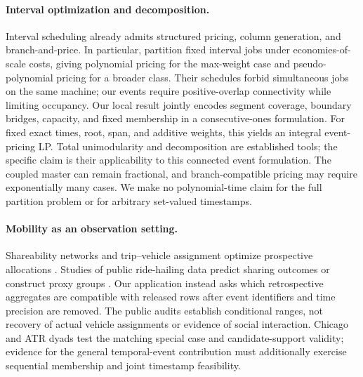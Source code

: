 \paragraph{Interval optimization and decomposition.}
Interval scheduling already admits structured pricing, column generation,
and branch-and-price. In particular, \citet{muir2023interval} partition fixed
interval jobs under economies-of-scale costs, giving polynomial pricing for
the max-weight case and pseudo-polynomial pricing for a broader class.
Their schedules forbid simultaneous jobs on the same machine; our events
require positive-overlap connectivity while limiting occupancy. Our local
result jointly encodes segment coverage, boundary bridges, capacity, and
fixed membership in a consecutive-ones formulation. For fixed exact times,
root, span, and additive weights, this yields an integral event-pricing LP.
Total unimodularity and decomposition are established tools; the specific
claim is their applicability to this connected event formulation.
The coupled master can remain fractional, and branch-compatible pricing may
require exponentially many cases. We make no polynomial-time claim for the
full partition problem or for arbitrary set-valued timestamps.

\paragraph{Mobility as an observation setting.}
Shareability networks and trip--vehicle assignment optimize prospective
allocations \citep{santi2014shareability,alonsomora2017ondemand}.
Studies of public ride-hailing data predict sharing outcomes or construct
proxy groups \citep{taiebat2022sharing,sebtichen2026hidden}.
Our application instead asks which retrospective aggregates are compatible
with released rows after event identifiers and time precision are removed.
The public audits establish conditional ranges, not recovery of actual
vehicle assignments or evidence of social interaction. Chicago and ATR
dyads test the matching special case and candidate-support validity; evidence
for the general temporal-event contribution must additionally exercise
sequential membership and joint timestamp feasibility.
